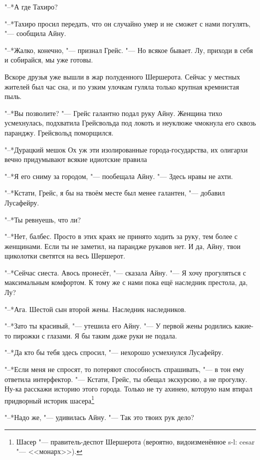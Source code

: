 "--*А где Тахиро?

"--*Тахиро просил передать, что он случайно умер и не сможет с нами погулять, "--- сообщила Айну.

"--*Жалко, конечно, "--- признал Грейс.
"--- Но всякое бывает.
Лу, приходи в себя и собирайся, мы уже готовы.

\razd

Вскоре друзья уже вышли в жар полуденного Шершерота.
Сейчас у местных жителей был час сна, и по узким улочкам гуляла только крупная кремнистая пыль.

"--*Вы позволите? "--- Грейс галантно подал руку Айну.
Женщина тихо усмехнулась, подхватила Грейсвольда под локоть и неуклюже чмокнула его сквозь паранджу.
Грейсвольд поморщился.

"--*Дурацкий мешок\ldotst
Ох уж эти изолированные города-государства, их олигархи вечно придумывают всякие идиотские правила\ldotst

"--*Я его сниму за городом, "--- пообещала Айну.
"--- Здесь нравы не ахти.

"--*Кстати, Грейс, я бы на твоём месте был менее галантен, "--- добавил Лусафейру.

"--*Ты ревнуешь, что ли?

"--*Нет, балбес.
Просто в этих краях не принято ходить за руку, тем более с женщинами.
Если ты не заметил, на парандже рукавов нет.
И да, Айну, твои щиколотки светятся на весь Шершерот.

"--*Сейчас сиеста.
Авось пронесёт, "--- сказала Айну.
"--- Я хочу прогуляться с максимальным комфортом.
К тому же с нами пока ещё наследник престола, да, Лу?

"--*Ага.
Шестой сын второй жены.
Наследник наследников.

"--*Зато ты красивый, "--- утешила его Айну.
"--- У первой жены родились какие-то пирожки с глазами.
Я бы таким даже руки не подала.

"--*Да кто бы тебя здесь спросил, "--- нехорошо усмехнулся Лусафейру.

"--*Если меня не спросят, то потеряют способность спрашивать, "--- в тон ему ответила интерфектор.
"--- Кстати, Грейс, ты обещал экскурсию, а не прогулку.
Ну-ка расскажи историю этого города.
Только не ту ахинею, которую нам втирал придворный историк шасера\footnote
{Шасер "--- правитель-деспот Шершерота (вероятно, видоизменённое s-l: cesar "--- <<монарх>>). \authornote}\ldotst

\spacing

"--*Надо же, "--- удивилась Айну.
"--- Так это твоих рук дело?

